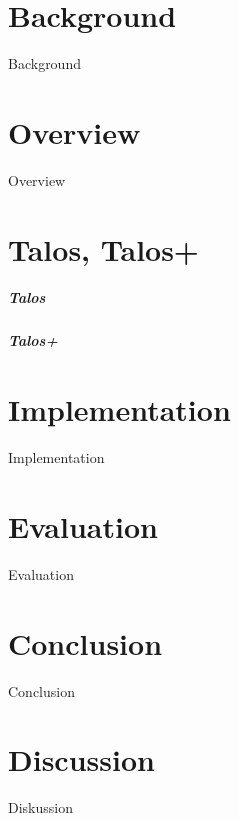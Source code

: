 \documentclass[a4paper,11pt]{report}
\begin{document}
\chapter{Background}
Background
\chapter{Overview}
Overview
\chapter{Talos, Talos+}
\paragraph{Talos}
\paragraph{Talos+}
\chapter{Implementation}
Implementation
\chapter{Evaluation}
Evaluation
\chapter{Conclusion}
Conclusion
\chapter{Discussion}
Diskussion

\cleardoublepage
\nocite{*}



\appendix
\end{document}
